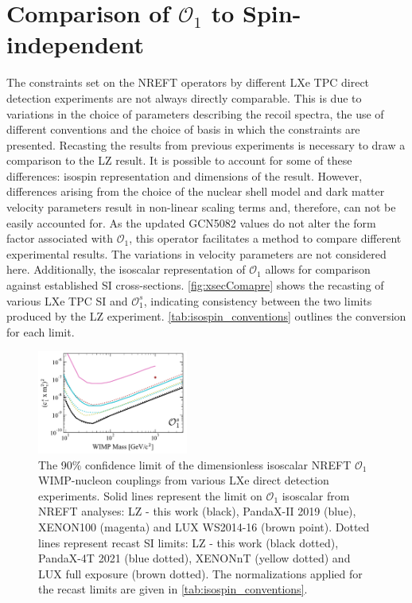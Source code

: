 \documentclass[reprint, showpacs,
preprintnumbers,
amsmath,amssymb,
aps, floatfix,
superscriptaddress,
prd, nofootinbib]{revtex4-1}
\begin{document}
\appendix
\section{Comparison of $\mathcal{O}_1$ to Spin-independent\label{ap:1}}
The constraints set on the NREFT operators by different LXe TPC direct detection experiments are not always directly comparable.
This is due to variations in the choice of parameters describing the recoil spectra, the use of different conventions and the choice of basis in which the constraints are presented. 
Recasting the results from previous experiments is necessary to draw a comparison to the LZ result.
It is possible to account for some of these differences: isospin representation and dimensions of the result. 
However, differences arising from the choice of the nuclear shell model and dark matter velocity parameters result in non-linear scaling terms and, therefore, can not be easily accounted for. 
As the updated GCN5082 values do not alter the form factor associated with $\mathcal{O}_1$, this operator facilitates a method to compare different experimental results. 
The variations in velocity parameters are not considered here.
Additionally, the isoscalar representation of $\mathcal{O}_1$ allows for comparison against established SI cross-sections.
\autoref{fig:xsecComapre} shows the recasting of various LXe TPC SI and $\mathcal{O}_1^s$, indicating consistency between the two limits produced by the LZ experiment.
\autoref{tab:isospin_conventions} outlines the conversion for each limit.


\begin{figure}
    \centering
    \includegraphics[width=0.44\textwidth]{SR1_EFT_O1s_c2_lim_Comparison_markers}
    \caption{The 90\% confidence limit of the dimensionless isoscalar NREFT $\mathcal{O}_1$ WIMP-nucleon couplings from various LXe direct detection experiments. 
    Solid lines represent the limit on $\mathcal{O}_1$ isoscalar from NREFT analyses: LZ - this work (black), PandaX-II 2019 (blue), XENON100 (magenta) and LUX WS2014-16 (brown point). 
    Dotted lines represent recast SI limits: LZ - this work (black dotted), PandaX-4T 2021 (blue dotted), XENONnT (yellow dotted) and LUX full exposure (brown dotted). 
    The normalizations applied for the recast limits are given in \autoref{tab:isospin_conventions}.}
    \label{fig:xsecComapre}
\end{figure}
\end{document}
